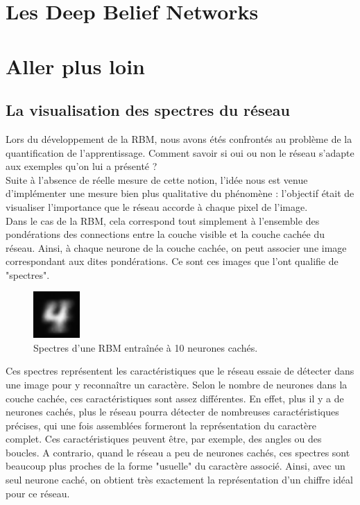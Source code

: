 \documentclass[a4paper,twoside]{report}
\begin{document}
        \chapter{Les Deep Belief Networks}



        \chapter{Aller plus loin}

            \section{La visualisation des spectres du réseau}

                Lors du développement de la RBM, nous avons étés confrontés au problème de la quantification de l'apprentissage. Comment savoir si oui ou non le réseau s'adapte aux exemples qu'on lui a présenté ?\\

                Suite à l'absence de réelle mesure de cette notion, l'idée nous est venue d'implémenter une mesure bien plus qualitative du phénomène : l'objectif était de visualiser l'importance que le réseau accorde à chaque pixel de l'image.\\

                Dans le cas de la RBM, cela correspond tout simplement à l'ensemble des pondérations des connections entre la couche visible et la couche cachée du réseau. Ainsi, à chaque neurone de la couche cachée, on peut associer une image correspondant aux dites pondérations. Ce sont ces images que l'ont qualifie de "spectres".

                \begin{figure}
                    \begin{center}
                        \includegraphics[width=50pt]{Images/spectres-01.png}
                    \end{center}
                    \caption{Spectres d'une RBM entraînée à 10 neurones cachés.}
                \end{figure}

                Ces spectres représentent les caractéristiques que le réseau essaie de détecter dans une image pour y reconnaître un caractère. Selon le nombre de neurones dans la couche cachée, ces caractéristiques sont assez différentes. En effet, plus il y a de neurones cachés, plus le réseau pourra détecter de nombreuses caractéristiques précises, qui une fois assemblées formeront la représentation du caractère complet. Ces caractéristiques peuvent être, par exemple, des angles ou des boucles. A contrario, quand le réseau a peu de neurones cachés, ces spectres sont beaucoup plus proches de la forme "usuelle" du caractère associé. Ainsi, avec un seul neurone caché, on obtient très exactement la représentation d'un chiffre idéal pour ce réseau.\\
\end{document}
